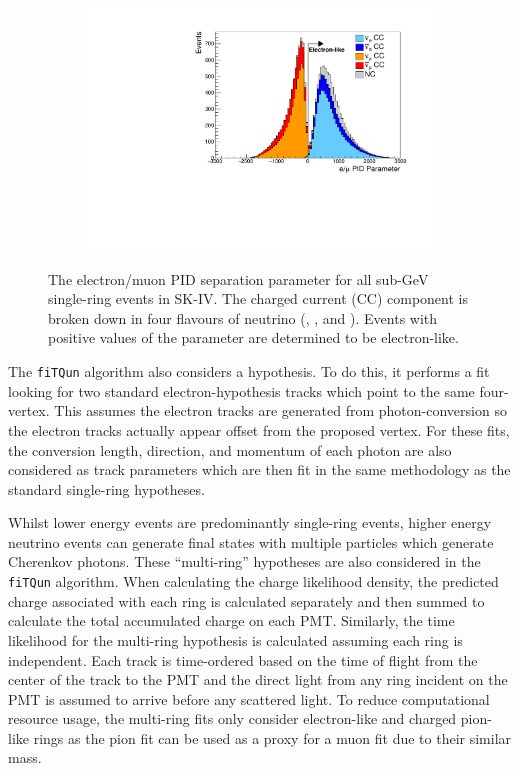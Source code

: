 \begin{figure}[h]
  \begin{subfigure}[t]{0.9\textwidth}
    \includegraphics[width=\textwidth, trim={0mm 0mm 0mm 0mm}, clip, page=1]{Figures/Simulations/PIDParameter.pdf}
  \end{subfigure}
  \caption{The electron/muon PID separation parameter for all sub-GeV single-ring events in SK-IV. The charged current (CC) component is broken down in four flavours of neutrino (\quickmath{\nu_{\mu}}, \quickmath{\bar{\nu}_{\mu}},  and ). Events with positive values of the parameter are determined to be electron-like.}
  \label{fig:Simulations_EMUPIDParamDistribution}
\end{figure}

The \texttt{fiTQun} algorithm also considers a  hypothesis. To do this, it performs a fit looking for two standard electron-hypothesis tracks which point to the same four-vertex. This assumes the electron tracks are generated from photon-conversion so the electron tracks actually appear offset from the proposed  vertex. For these fits, the conversion length, direction, and momentum of each photon are also considered as track parameters which are then fit in the same methodology as the standard single-ring hypotheses. 

Whilst lower energy events are predominantly single-ring events, higher energy neutrino events can generate final states with multiple particles which generate Cherenkov photons. These ``multi-ring'' hypotheses are also considered in the \texttt{fiTQun} algorithm. When calculating the charge likelihood density, the predicted charge associated with each ring is calculated separately and then summed to calculate the total accumulated charge on each PMT. Similarly, the time likelihood for the multi-ring hypothesis is calculated assuming each ring is independent. Each track is time-ordered based on the time of flight from the center of the track to the PMT and the direct light from any ring incident on the PMT is assumed to arrive before any scattered light. To reduce computational resource usage, the multi-ring fits only consider electron-like and charged pion-like rings as the pion fit can be used as a proxy for a muon fit due to their similar mass.

